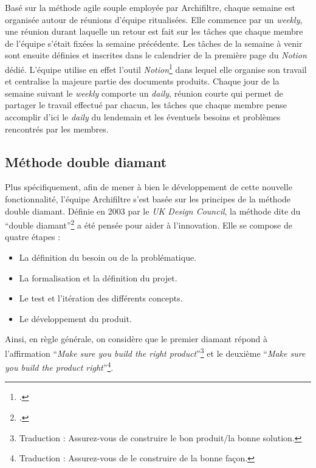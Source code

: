 Basé sur la méthode \gls{agile} souple employée par \gls{Archifiltre}, chaque semaine est organisée autour de réunions d’équipe ritualisées. Elle commence par un \textit{weekly}, une réunion durant laquelle un retour est fait sur les tâches que chaque membre de l’équipe s’était fixées la semaine précédente. Les tâches de la semaine à venir sont ensuite définies et inscrites dans le calendrier de la première page du \textit{Notion} dédié. L’équipe utilise en effet l’outil \textit{Notion}\footcite{noauthor_documentation_nodate} dans lequel elle organise son travail et centralise la majeure partie des documents produits. Chaque jour de la semaine suivant le \textit{weekly} comporte un \textit{daily}, réunion courte qui permet de partager le travail effectué par chacun, les tâches que chaque membre pense accomplir d’ici le \textit{daily} du lendemain et les éventuels besoins et problèmes rencontrés par les membres. 

\subsection{Méthode double diamant}
Plus spécifiquement, afin de mener à bien le développement de cette nouvelle fonctionnalité, l’équipe \gls{Archifiltre} s’est basée sur les principes de la méthode double diamant. Définie en 2003 par le \textit{UK Design Council}, la méthode dite du \enquote{double diamant}\footcite{design_council_double_nodate} a été pensée pour aider à l’innovation. Elle se compose de quatre étapes : 
\begin{itemize}
	\item La définition du besoin ou de la problématique.
	\item La formalisation et la définition du projet.
	\item Le test et l’itération des différents concepts.
	\item Le développement du produit.
\end{itemize}
Ainsi, en règle générale, on considère que le premier diamant répond à l’affirmation \enquote{\textit{Make sure you build the right product}}\footnote{Traduction : Assurez-vous de construire le bon produit/la bonne solution.} et le deuxième \enquote{\textit{Make sure you build the product right}}\footnote{Traduction : Assurez-vous de le construire de la bonne façon.}.



